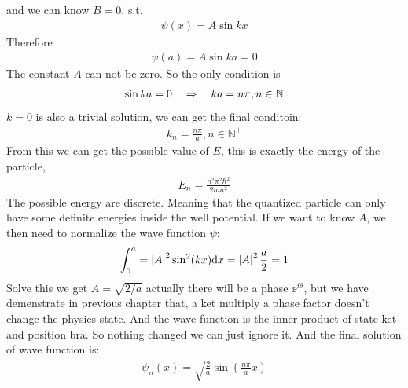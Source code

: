 and we can know $B = 0$, s.t. 
\begin{eqnarray}
    \psi(x) = A \sin kx
\end{eqnarray}
Therefore 
\begin{eqnarray}
    \psi(a) = A \sin k a = 0
\end{eqnarray}
The constant $A$ can not be zero. So the only condition is 
\begin{eqnarray}
    \sin k a =0 \quad \Rightarrow \quad ka = n \pi, n \in \mathbb{N}
\end{eqnarray}
$k=0$ is also a trivial solution, we can get the final conditoin: 
\begin{eqnarray}
    k_n = \frac{n \pi}{ a}, n \in \mathbb{N}^+
\end{eqnarray}
From this we can get the possible value of $E$, this is exactly the energy of the particle,
\begin{eqnarray}
    E_n = \frac{n^2 \pi^2 \hbar^2}{2m a ^2}
\end{eqnarray}
The possible energy are discrete. Meaning that the quantized particle can only have some definite energies inside the well potential. If we want to know $A$, we then need to normalize the wave function $\psi$: 
\begin{eqnarray}
    \int_{0}^{a} = \left| A \right|^2 \sin^2 (kx) \mathrm{d} x = \left| A \right|^2 \frac{a}{2} = 1 
\end{eqnarray}
Solve this we get $A = \sqrt{2/a}$ actually there will be a phase $\ee^{i \theta}$, but we have demenstrate in previous chapter that, a ket multiply a phase factor doesn't change the physics state. And the wave function is the inner product of state ket and position bra. So nothing changed we can just ignore it.
And the final solution of wave function is: 
\begin{eqnarray}
    \psi_n(x) = \sqrt{\frac{2}{a}} \sin \left(\frac{n \pi}{a} x\right)
\end{eqnarray}

